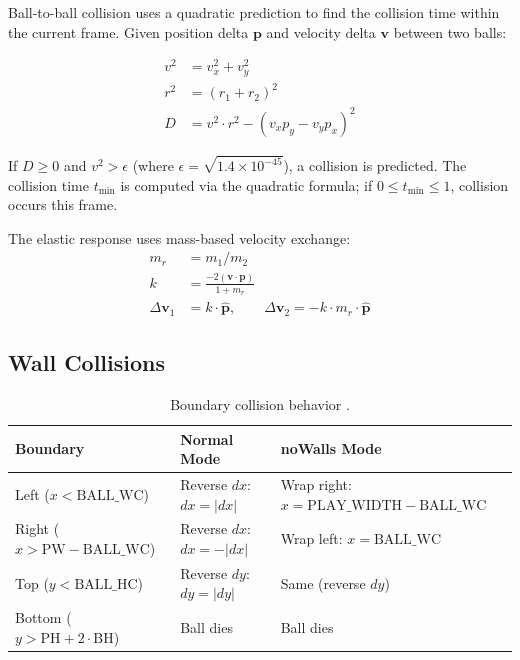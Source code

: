 \documentclass[11pt,a4paper]{article}
\begin{document}
Ball-to-ball collision uses a quadratic prediction to find the collision time within the current frame. Given position delta $\mathbf{p}$ and velocity delta $\mathbf{v}$ between two balls:

\begin{align}
  v^2 &= v_x^2 + v_y^2 \\
  r^2 &= (r_1 + r_2)^2 \\
  D &= v^2 \cdot r^2 - (v_x p_y - v_y p_x)^2
\end{align}

If $D \geq 0$ and $v^2 > \epsilon$ (where $\epsilon = \sqrt{1.4 \times 10^{-45}}$), a collision is predicted. The collision time $t_{\min}$ is computed via the quadratic formula; if $0 \leq t_{\min} \leq 1$, collision occurs this frame.

The elastic response uses mass-based velocity exchange:
\begin{align}
  m_r &= m_1 / m_2 \\
  k &= \frac{-2(\mathbf{v} \cdot \mathbf{p})}{1 + m_r} \\
  \Delta\mathbf{v}_1 &= k \cdot \hat{\mathbf{p}}, \qquad
  \Delta\mathbf{v}_2 = -k \cdot m_r \cdot \hat{\mathbf{p}}
\end{align}

\subsection{Wall Collisions}
\label{sec:wall-collisions}

\begin{table}[htbp]
\centering
\caption{Boundary collision behavior .}
\label{tab:wall-collisions}
\begin{tabularx}{\textwidth}{lXX}
\toprule
\textbf{Boundary} & \textbf{Normal Mode} & \textbf{noWalls Mode} \\
\midrule
Left ($x < \text{BALL\_WC}$)   & Reverse $dx$: $dx = |dx|$   & Wrap right: $x = \text{PLAY\_WIDTH} - \text{BALL\_WC}$ \\
Right ($x > \text{PW} - \text{BALL\_WC}$)  & Reverse $dx$: $dx = -|dx|$  & Wrap left: $x = \text{BALL\_WC}$ \\
Top ($y < \text{BALL\_HC}$)    & Reverse $dy$: $dy = |dy|$   & Same (reverse $dy$) \\
Bottom ($y > \text{PH} + 2 \cdot \text{BH}$) & Ball dies & Ball dies \\
\bottomrule
\end{tabularx}
\end{table}
\end{document}
